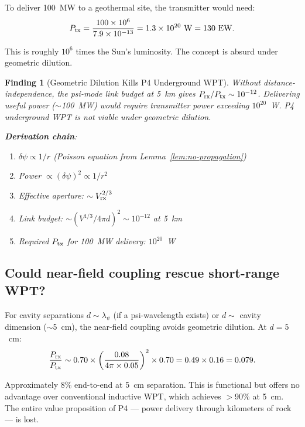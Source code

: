 \documentclass[11pt]{article}
\newtheorem{finding}{Finding}
\newcommand{\ee}[1]{\times 10^{#1}}
\begin{document}
To deliver 100~MW to a geothermal site, the transmitter would need:
\begin{equation}
P_{\rm tx} = \frac{100\ee{6}}{7.9\ee{-13}} = 1.3\ee{20}~\text{W}
= 130~\text{EW}.
\end{equation}

This is roughly $10^6$ times the Sun's luminosity. The concept is
absurd under geometric dilution.

\begin{finding}[Geometric Dilution Kills P4 Underground WPT]
\label{find:link-budget}
Without distance-independence, the psi-mode link budget at 5~km gives
$P_{\rm rx}/P_{\rm tx} \sim 10^{-12}$. Delivering useful power
($\sim$100~MW) would require transmitter power exceeding $10^{20}$~W.
P4 underground WPT is not viable under geometric dilution.

\textbf{Derivation chain}:
\begin{enumerate}[nosep]
\item $\delta\psi \propto 1/r$ (Poisson equation from Lemma~\ref{lem:no-propagation})
\item Power $\propto (\delta\psi)^2 \propto 1/r^2$
\item Effective aperture: $\sim V_{\rm rx}^{2/3}$
\item Link budget: $\sim (V^{1/3}/4\pi d)^2 \sim 10^{-12}$ at 5~km
\item Required $P_{\rm tx}$ for 100~MW delivery: $10^{20}$~W
\end{enumerate}
\end{finding}

\subsection{Could near-field coupling rescue short-range WPT?}

For cavity separations $d \sim \lambda_\psi$ (if a psi-wavelength
exists) or $d \sim$ cavity dimension ($\sim$5~cm), the near-field
coupling avoids geometric dilution. At $d = 5$~cm:
\begin{equation}
\frac{P_{\rm rx}}{P_{\rm tx}} \sim 0.70 \times
\left(\frac{0.08}{4\pi \times 0.05}\right)^2 \times 0.70
= 0.49 \times 0.16 = 0.079.
\end{equation}

Approximately 8\% end-to-end at 5~cm separation. This is functional but
offers no advantage over conventional inductive WPT, which achieves
$>$90\% at 5~cm. The entire value proposition of P4 --- power delivery
through kilometers of rock --- is lost.
\end{document}
